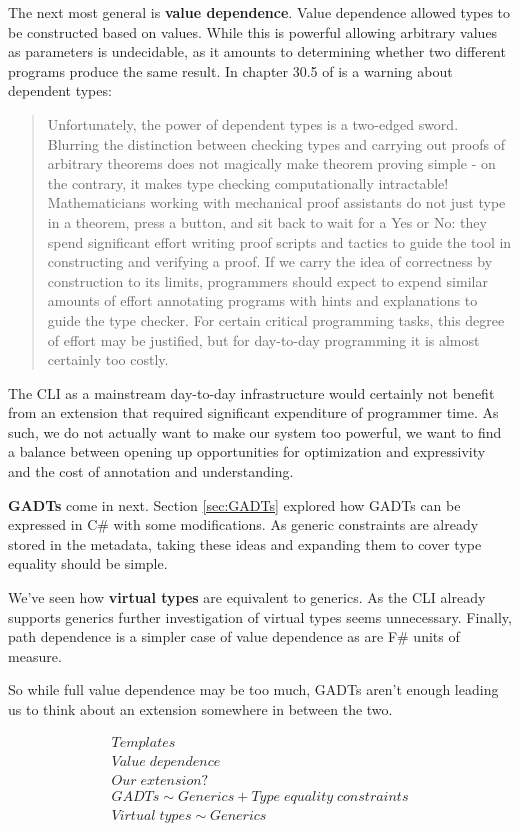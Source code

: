 \documentclass[english]{report}
\begin{document}
The next most general is \textbf{value dependence}. Value dependence
allowed types to be constructed based on values. While this is powerful
allowing arbitrary values as parameters is undecidable, as it amounts
to determining whether two different programs produce the same result.
In chapter 30.5 of \cite{tapl} is a warning about dependent types:
\begin{quotation}
Unfortunately, the power of dependent types is a two-edged sword.
Blurring the distinction between checking types and carrying out proofs
of arbitrary theorems does not magically make theorem proving simple
- on the contrary, it makes type checking computationally intractable!
Mathematicians working with mechanical proof assistants do not just
type in a theorem, press a button, and sit back to wait for a Yes
or No: they spend significant effort writing proof scripts and tactics
to guide the tool in constructing and verifying a proof. If we carry
the idea of correctness by construction to its limits, programmers
should expect to expend similar amounts of effort annotating programs
with hints and explanations to guide the type checker. For certain
critical programming tasks, this degree of effort may be justified,
but for day-to-day programming it is almost certainly too costly.
\end{quotation}
The CLI as a mainstream day-to-day infrastructure would certainly
not benefit from an extension that required significant expenditure
of programmer time. As such, we do not actually want to make our system
too powerful, we want to find a balance between opening up opportunities
for optimization and expressivity and the cost of annotation and understanding.

\textbf{GADTs} come in next. Section \ref{sec:GADTs} explored how
GADTs can be expressed in C\# with some modifications. As generic
constraints are already stored in the metadata, taking these ideas
and expanding them to cover type equality should be simple. 

We've seen how \textbf{virtual types} are equivalent to generics.
As the CLI already supports generics further investigation of virtual
types seems unnecessary. Finally, path dependence is a simpler case
of value dependence as are F\# units of measure. 

So while full value dependence may be too much, GADTs aren't enough
leading us to think about an extension somewhere in between the two.

\[
\begin{array}{c}
Templates\\
Value\; dependence\\
Our\; extension?\\
GADTs\sim Generics+Type\; equality\; constraints\\
Virtual\; types\sim Generics
\end{array}
\]
\end{document}
